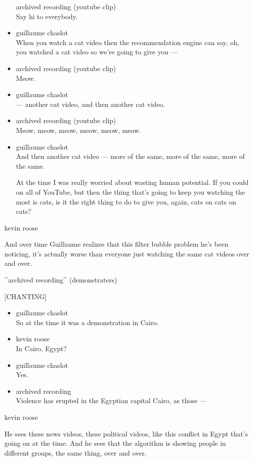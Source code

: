 \begin{itemize}
  archived recording (youtube clip)\\
  Say hi to everybody.
\item
  guillaume chaslot\\
  When you watch a cat video then the recommendation engine can say, oh,
  you watched a cat video so we're going to give you ---
\item
  archived recording (youtube clip)\\
  Meow.
\item
  guillaume chaslot\\
  --- another cat video, and then another cat video.
\item
  archived recording (youtube clip)\\
  Meow, meow, meow, meow, meow, meow.
\item
  guillaume chaslot\\
  And then another cat video --- more of the same, more of the same,
  more of the same.

  At the time I was really worried about wasting human potential. If you
  could on all of YouTube, but then the thing that's going to keep you
  watching the most is cats, is it the right thing to do to give you,
  again, cats on cats on cats?
\end{itemize}

kevin roose

And over time Guillaume realizes that this filter bubble problem he's
been noticing, it's actually worse than everyone just watching the same
cat videos over and over.

\^{}archived recording\^{} (demonstraters)

{[}CHANTING{]}

\begin{itemize}
\item
  guillaume chaslot\\
  So at the time it was a demonstration in Cairo.
\item
  kevin roose\\
  In Cairo, Egypt?
\item
  guillaume chaslot\\
  Yes.
\item
  archived recording\\
  Violence has erupted in the Egyptian capital Cairo, as those ---
\end{itemize}

kevin roose

He sees these news videos, these political videos, like this conflict in
Egypt that's going on at the time. And he sees that the algorithm is
showing people in different groups, the same thing, over and over.

